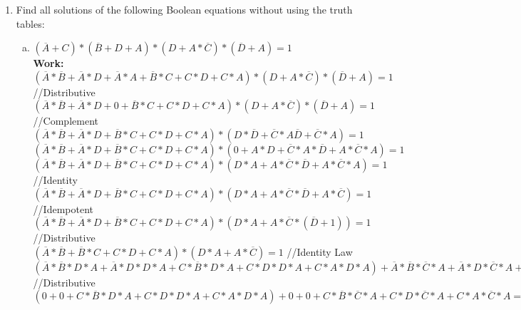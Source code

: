 \documentclass[11pt]{article}
\begin{document}
\begin{enumerate}
    \item Find all solutions of the following Boolean equations without using the truth tables:
    \begin{enumerate}[(a)]
        \item $(\overline{A} + C) * (\overline{B} + D + A) * (D + A * \overline{C}) * (\overline{D} + A) = 1$\\
        \textbf{Work:}\\
            $ (\overline{A} * \overline{B} + \overline{A} * D + \overline{A} * A + \overline{B} * C + C * D + C * A) * (D + A * \overline{C}) * (\overline{D} + A) = 1$ //Distributive\\
            $ (\overline{A} * \overline{B} + \overline{A} * D + 0 + \overline{B} * C + C * D + C * A) * (D + A * \overline{C}) * (\overline{D} + A) = 1$ //Complement\\
            $ (\overline{A} * \overline{B} + \overline{A} * D + \overline{B} * C + C * D + C * A) * (D * \overline{D} + \overline{C} * A \overline{D} + \overline{C} * A) = 1$\\
            $ (\overline{A} * \overline{B} + \overline{A} * D + \overline{B} * C + C * D + C * A) * (0 + A * D + \overline{C} * A * \overline{D} + A * \overline{C} * A) = 1$\\
            $ (\overline{A} * \overline{B} + \overline{A} * D + \overline{B} * C + C * D + C * A) * (D * A + A * \overline{C} * \overline{D} + A * \overline{C} * A) = 1$ //Identity\\
            $ (\overline{A} * \overline{B} + \overline{A} * D + \overline{B} * C + C * D + C * A) * (D * A + A * \overline{C} * \overline{D} + A * \overline{C}) = 1$ //Idempotent\\ 
            $ (\overline{A} * \overline{B} + \overline{A} * D + \overline{B} * C + C * D + C * A) * (D * A + A * \overline{C} * (\overline{D} + 1)) = 1$ //Distributive\\
            $ (\overline{A} * \overline{B} +  \overline{B} * C + C * D + C * A) * (D * A + A * \overline{C}) = 1$ //Identity Law\\
            $ (\overline{A} * \overline{B} * D * A + \overline{A} * D * D * A + C * \overline{B} * D * A + C * D * D * A + C * A * D * A) + \overline{A} * \overline{B} * \overline{C} * A + \overline{A} * D * \overline{C} * A + C * \overline{B} * \overline{C} * A + C * D * \overline{C} * A + C * A * \overline{C} * A = 1$ //Distributive\\
            $ (0 + 0 + C * \overline{B} * D * A + C * D * D * A + C * A * D * A) + 0 + 0 + C * \overline{B} * \overline{C} * A + C * D * \overline{C} * A + C * A * \overline{C} * A = 1$\\

\end{enumerate}
\end{enumerate}
\end{document}
